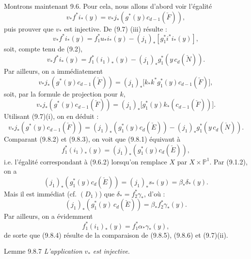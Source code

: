 Montrons maintenant 9.6. Pour cela, nous allons d'abord voir l'égalité
\[
v_*f^*i_*(y)=v_*j_*(g^*(y)c_{d-1}(\check F)),
\tag{9.8.1}
\]
puis prouver que $v_*$ est injective. De (9.7) (iii) résulte :
\[
v_*f^*i_*(y)=f_1^*u_*i_*(y)-(j_1)_*[g_1^*i^*i_*(y)],
\]
soit, compte tenu de (9.2),
\[
v_*f^*i_*(y)=f_1^*(i_1)_*(y)-(j_1)_*g_1^*(y\,c_d(\check N)).
\tag{9.8.2}
\]
Par ailleurs, on a immédiatement
\[
v_*j_*(g^*(y)c_{d-1}(\check F))
=(j_1)_*\bigl[k_*k^*g_1^*(y)c_{d-1}(\check F)\bigr],
\]
soit, par la formule de projection pour $k$,
\[
v_*j_*(g^*(y)c_{d-1}(\check F))
=(j_1)_*\bigl[g_1^*(y)k_*(c_{d-1}(\check F))\bigr].
\]
Utilisant (9.7)(i), on en déduit :
\[
v_*j_*(g^*(y)c_{d-1}(\check F))
=(j_1)_*(g_1^*(y)c_d(\check E))-(j_1)_*g_1^*(y\,c_d(\check N)).
\tag{9.8.3}
\]
Comparant (9.8.2) et (9.8.3), on voit que (9.8.1) équivaut à
\[
f_1^*(i_1)_*(y)=(j_1)_*(g_1^*(y)c_d(\check E)),
\tag{9.8.4}
\]
i.e. l'égalité correspondant à (9.6.2) lorsqu'on remplace $X$ par $X\times\mathbb{P}^1$. Par (9.1.2), on a
\[
(j_1)_*(g_1^*(y)c_d(\check E))=(j_1)_*s_*(y)=\beta_*\delta_*(y).
\]
Mais il est immédiat (cf. $(D_1)$) que $\delta_*=f_2^*\gamma_*$, d'où :
\[
(j_1)_*(g_1^*(y)\,c_d(\check E))=\beta_*f_2^*\gamma_*(y).
\tag{9.8.5}
\]
Par ailleurs, on a évidemment
\[
f_1^*(i_1)_*(y)=f_1^*\alpha_*\gamma_*(y),
\tag{9.8.6}
\]
de sorte que (9.8.4) résulte de la comparaison de (9.8.5), (9.8.6) et (9.7)(ii).

\begin{statement}{Lemme 9.8.7}
\emph{L'application} $v_*$ \emph{est injective}.
\end{statement}

